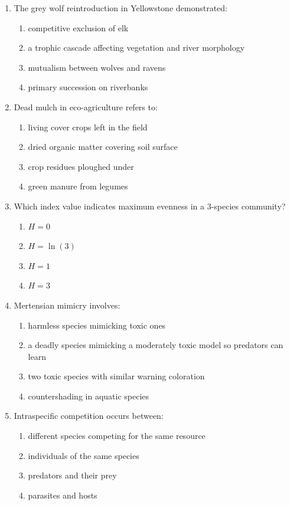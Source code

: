 \documentclass[11pt]{article}
\begin{document}
\begin{enumerate}[label=\textbf{\arabic*.}]
\clearpage

\item The grey wolf reintroduction in Yellowstone demonstrated:
\begin{enumerate}[label=\Alph*.]
  \item competitive exclusion of elk
  \item a trophic cascade affecting vegetation and river morphology
  \item mutualism between wolves and ravens
  \item primary succession on riverbanks
\end{enumerate}

\item Dead mulch in eco-agriculture refers to:
\begin{enumerate}[label=\Alph*.]
  \item living cover crops left in the field
  \item dried organic matter covering soil surface
  \item crop residues ploughed under
  \item green manure from legumes
\end{enumerate}

\item Which index value indicates maximum evenness in a 3-species community?
\begin{enumerate}[label=\Alph*.]
  \item $H = 0$
  \item $H = \ln(3)$
  \item $H = 1$
  \item $H = 3$
\end{enumerate}

\item Mertensian mimicry involves:
\begin{enumerate}[label=\Alph*.]
  \item harmless species mimicking toxic ones
  \item a deadly species mimicking a moderately toxic model so predators can learn
  \item two toxic species with similar warning coloration
  \item countershading in aquatic species
\end{enumerate}

\item Intraspecific competition occurs between:
\begin{enumerate}[label=\Alph*.]
  \item different species competing for the same resource
  \item individuals of the same species
  \item predators and their prey
  \item parasites and hosts
\end{enumerate}


\end{enumerate}
\end{document}
